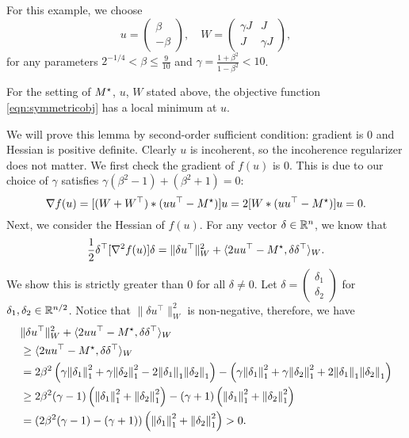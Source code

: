 For this example, we choose 
\[
u = \left(\begin{array}{c} \beta \\ -\beta \end{array}\right), \quad W = \left(\begin{array}{cc} \gamma J & J \\ J & \gamma J \end{array}\right),
\]
for any parameters $2^{-1/4} < \beta \le \frac{9}{10}$ and $\gamma = \frac{1+\beta^2}{1-\beta^2} < 10$.

\begin{lemma}
For the setting of $M^\star$, $u$, $W$ stated above, the objective function \eqref{eqn:symmetricobj} has a local minimum at $u$.
\end{lemma}

We will prove this lemma by second-order sufficient condition: gradient is 0 and Hessian is positive definite. Clearly $u$ is incoherent, so the incoherence regularizer does not matter. We first check the gradient of $f(u)$ is 0. This is due to our choice of $\gamma$ satisfies $\gamma(\beta^2-1) + (\beta^2+1) = 0$:
\[
\nabla f(u) = [(W + W^\top) * (uu^\top - M^\star)] u = 2[W * (uu^\top - M^\star)] u = 0.
\]
Next, we consider the Hessian of $f(u)$.
For any vector $\delta \in \mathbb{R}^n$, we know that
\[
\frac{1}{2}\delta^\top [\nabla^2 f(u)] \delta = \|\delta u^\top\|_W^2 + \langle 2uu^\top - M^\star,\delta\delta^\top\rangle_W.
\]
We show this is strictly greater than 0 for all $\delta \neq 0$.
Let $\delta = \left( \begin{array}{c} \delta_1 \\ \delta_2 \end{array} \right)$ for $\delta_1, \delta_2 \in \mathbb{R}^{n/2}$.
Notice that $\|\delta u^\top\|_W^2$ is non-negative, therefore, we have
\begin{align*}
& \|\delta u^\top\|_W^2 + \langle 2uu^\top - M^\star,\delta\delta^\top\rangle_W \\
& \ge \langle 2uu^\top - M^\star,\delta\delta^\top\rangle_W \\
& = 2\beta^2 \left(\gamma{\lVert\delta_1{\rVert}}_1^2 + \gamma{\lVert\delta_2{\rVert}}_1^2 - 2 {\lVert\delta_1{\rVert}}_1 {\lVert\delta_2{\rVert}}_1 \right) - \left(\gamma{\lVert\delta_1{\rVert}}_1^2 + \gamma{\lVert\delta_2{\rVert}}_1^2 + 2 {\lVert\delta_1{\rVert}}_1 {\lVert\delta_2{\rVert}}_1\right) \\
& \ge 2\beta^2 (\gamma-1) \left({\lVert\delta_1{\rVert}}_1^2 + {\lVert\delta_2{\rVert}}_1^2\right) - (\gamma+1) \left({\lVert\delta_1{\rVert}}_1^2 + {\lVert\delta_2{\rVert}}_1^2\right) \\
& = (2\beta^2 (\gamma-1) - (\gamma+1))\left({\lVert\delta_1{\rVert}}_1^2 + {\lVert\delta_2{\rVert}}_1^2\right) > 0.
\end{align*}


